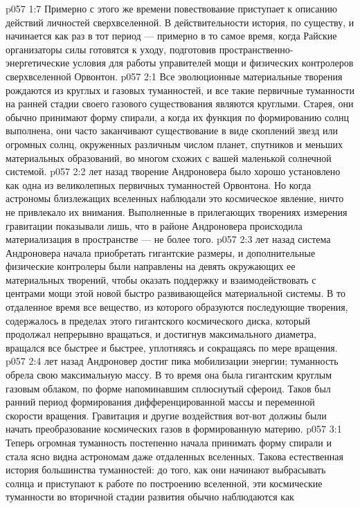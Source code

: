 \vs p057 1:7 Примерно с этого же времени повествование приступает к описанию действий личностей сверхвселенной. В действительности история, по существу, и начинается как раз в тот период --- примерно в то самое время, когда Райские организаторы силы готовятся к уходу, подготовив пространственно\hyp{}энергетические условия для работы управителей мощи и физических контролеров сверхвселенной Орвонтон.
\vs p057 2:1 Все эволюционные материальные творения рождаются из круглых и газовых туманностей, и все такие первичные туманности на ранней стадии своего газового существования являются круглыми. Старея, они обычно принимают форму спирали, а когда их функция по формированию солнц выполнена, они часто заканчивают существование в виде скоплений звезд или огромных солнц, окруженных различным числом планет, спутников и меньших материальных образований, во многом схожих с вашей маленькой солнечной системой.
\vs p057 2:2 \pc {} лет назад творение Андроновера было хорошо установлено как одна из великолепных первичных туманностей Орвонтона. Но когда астрономы близлежащих вселенных наблюдали это космическое явление, ничто не привлекало их внимания. Выполненные в прилегающих творениях измерения гравитации показывали лишь, что в районе Андроновера происходила материализация в пространстве --- не более того.
\vs p057 2:3 \pc {} лет назад система Андроновера начала приобретать гигантские размеры, и дополнительные физические контролеры были направлены на девять окружающих ее материальных творений, чтобы оказать поддержку и взаимодействовать с центрами мощи этой новой быстро развивающейся материальной системы. В то отдаленное время все вещество, из которого образуются последующие творения, содержалось в пределах этого гигантского космического диска, который продолжал непрерывно вращаться, и достигнув максимального диаметра, вращался все быстрее и быстрее, уплотняясь и сокращаясь по мере вращения.
\vs p057 2:4 \pc {} лет назад Андроновер достиг пика мобилизации энергии; туманность обрела свою максимальную массу. В то время она была гигантским круглым газовым облаком, по форме напоминавшим сплюснутый сфероид. Таков был ранний период формирования дифференцированной массы и переменной скорости вращения. Гравитация и другие воздействия вот\hyp{}вот должны были начать преобразование космических газов в формированную материю.
\vs p057 3:1 Теперь огромная туманность постепенно начала принимать форму спирали и стала ясно видна астрономам даже отдаленных вселенных. Такова естественная история большинства туманностей: до того, как они начинают выбрасывать солнца и приступают к работе по построению вселенной, эти космические туманности во вторичной стадии развития обычно наблюдаются как 
